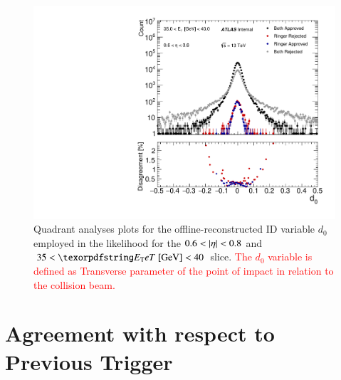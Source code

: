 \begin{figure}[h!tb]
\centering
\includegraphics[width=.5\textwidth]{sections/analyses/figures/quadrant_plots/HLT_e28_lhtight_nod0_noringer_ivarloose_HLT_e28_lhtight_nod0_ivarloose_trackd0pvunbiased_et4_eta1.pdf}




\caption{\label{fig:quadrant_track_variables_30GeV}
Quadrant analyses plots for the offline-reconstructed ID variable $d_0$ employed in the
likelihood for the $0.6<\abseta{}<0.8$ and $35<\et{}~[\text{GeV}]<40$ slice. \textcolor{red}{The $d_0$ variable is defined as Transverse parameter of the point of impact in relation to the collision beam.} 
}
\end{figure}

\FloatBarrier
\section[Agreement with respect to Previous
Trigger]{Agreement with respect to Previous Trigger}\label{ssec:agreement}

